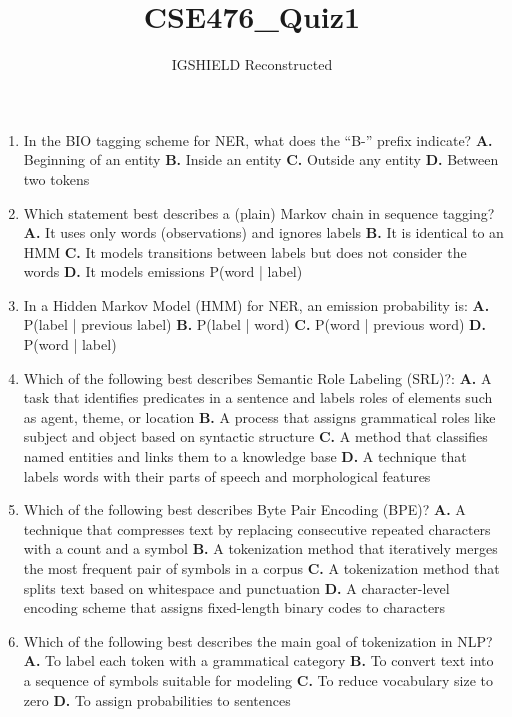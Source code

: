\documentclass[11pt]{article}
\title{CSE476\_Quiz1}
\author{IGSHIELD Reconstructed}
\date{}
\begin{document}
\maketitle
\begin{enumerate}[leftmargin=*]
  \item In the BIO tagging scheme for NER, what does the ``B-'' prefix indicate?
    \textbf{A.} Beginning of an entity
    \textbf{B.} Inside an entity
    \textbf{C.} Outside any entity
    \textbf{D.} Between two tokens

  \item Which statement best describes a (plain) Markov chain in sequence tagging?
    \textbf{A.} It uses only words (observations) and ignores labels
    \textbf{B.} It is identical to an HMM
    \textbf{C.} It models transitions between labels but does not consider the words
    \textbf{D.} It models emissions P(word | label)

  \item In a Hidden Markov Model (HMM) for NER, an emission probability is:
    \textbf{A.} P(label | previous label)
    \textbf{B.} P(label | word)
    \textbf{C.} P(word | previous word)
    \textbf{D.} P(word | label)

  \item Which of the following best describes Semantic Role Labeling (SRL)?:
    \textbf{A.} A task that identifies predicates in a sentence and labels roles of elements such as agent, theme, or location
    \textbf{B.} A process that assigns grammatical roles like subject and object based on syntactic structure
    \textbf{C.} A method that classifies named entities and links them to a knowledge base
    \textbf{D.} A technique that labels words with their parts of speech and morphological features

  \item Which of the following best describes Byte Pair Encoding (BPE)?
    \textbf{A.} A technique that compresses text by replacing consecutive repeated characters with a count and a symbol
    \textbf{B.} A tokenization method that iteratively merges the most frequent pair of symbols in a corpus
    \textbf{C.} A tokenization method that splits text based on whitespace and punctuation
    \textbf{D.} A character-level encoding scheme that assigns fixed-length binary codes to characters

  \item Which of the following best describes the main goal of tokenization in NLP?
    \textbf{A.} To label each token with a grammatical category
    \textbf{B.} To convert text into a sequence of symbols suitable for modeling
    \textbf{C.} To reduce vocabulary size to zero
    \textbf{D.} To assign probabilities to sentences


\end{enumerate}
\end{document}
